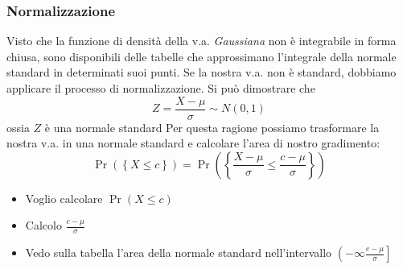 \subsubsection*{Normalizzazione}
Visto che la funzione di densità della v.a. \textit{Gaussiana} non è integrabile in forma chiusa, sono disponibili delle tabelle che approssimano l'integrale della normale standard in determinati suoi punti. Se la nostra v.a. non è standard, dobbiamo applicare il processo di normalizzazione. Si può dimostrare che
\[
	Z = \frac{ X - \mu }{\sigma } \sim  N \left(0,1\right)
\]
ossia $ Z $ è una normale standard
Per questa ragione possiamo trasformare la nostra v.a. in una normale standard e calcolare l'area di nostro gradimento:
\[
	\Pr \left(\left\{ X \le  c\right\}\right) = \Pr \left(\left\{\frac{ X - \mu }{\sigma }\le  \frac{ c - \mu  }{\sigma }\right\}\right)
\]
\begin{itemize}
	\item Voglio calcolare $ \Pr\left(X \le c\right) $
	\item Calcolo $ \frac{c -\mu }{\sigma } $
	\item Vedo sulla tabella l'area della normale standard nell'intervallo $ \left(-\infty \frac{ c - \mu }{\sigma }\right] $
\end{itemize}
